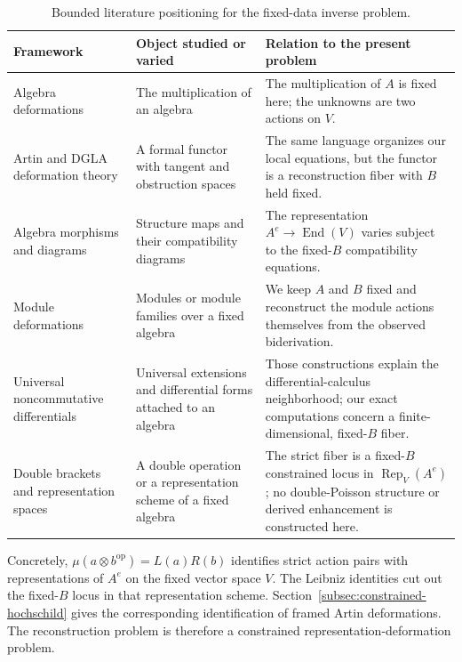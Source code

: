 \documentclass[11pt]{amsart}
\newcommand{\End}{\operatorname{End}}
\begin{document}
\begin{table}[ht]
\centering
\small
\caption{Bounded literature positioning for the fixed-data inverse problem.}
\label{tab:framework-comparison}
\begin{tabular}{@{}>{\raggedright\arraybackslash}p{}>{\raggedright\arraybackslash}p{}>{\raggedright\arraybackslash}p{}@{}}
\toprule
Framework & Object studied or varied & Relation to the present problem \\
\midrule
Algebra deformations \cite{Gerstenhaber1964} & The multiplication of an algebra & The multiplication of $A$ is fixed here; the unknowns are two actions on $V$. \\
Artin and DGLA deformation theory \cite{Schlessinger1968,Manetti2005} & A formal functor with tangent and obstruction spaces & The same language organizes our local equations, but the functor is a reconstruction fiber with $B$ held fixed. \\
Algebra morphisms and diagrams \cite{GerstenhaberSchack1983,GerstenhaberSchack1985} & Structure maps and their compatibility diagrams & The representation $A^e\to\End(V)$ varies subject to the fixed-$B$ compatibility equations. \\
Module deformations \cite{Laudal2002} & Modules or module families over a fixed algebra & We keep $A$ and $B$ fixed and reconstruct the module actions themselves from the observed biderivation. \\
Universal noncommutative differentials \cite{CuntzQuillen1995} & Universal extensions and differential forms attached to an algebra & Those constructions explain the differential-calculus neighborhood; our exact computations concern a finite-dimensional, fixed-$B$ fiber. \\
Double brackets and representation spaces \cite{VanDenBergh2008,BerestKhachatryanRamadoss2013} & A double operation or a representation scheme of a fixed algebra & The strict fiber is a fixed-$B$ constrained locus in $\operatorname{Rep}_V(A^e)$; no double-Poisson structure or derived enhancement is constructed here. \\
\bottomrule
\end{tabular}
\end{table}

Concretely, $\mu(a\otimes b^{\mathrm{op}})=L(a)R(b)$ identifies strict
action pairs with representations of $A^e$ on the fixed vector space $V$.
The Leibniz identities cut out the fixed-$B$ locus in that representation
scheme. Section~\ref{subsec:constrained-hochschild} gives the corresponding
identification of framed Artin deformations. The reconstruction problem is
therefore a constrained representation-deformation problem.
\end{document}
